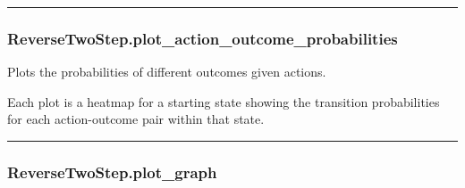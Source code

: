 \begin{Shaded}
\begin{Highlighting}[]
\OperatorTok{=}
\end{Highlighting}
\end{Shaded}

\begin{center}\rule{0.5\linewidth}{\linethickness}\end{center}

\subsubsection{ReverseTwoStep.plot\_action\_outcome\_probabilities}\label{reversetwostep.plot_action_outcome_probabilities}

\begin{Shaded}
\begin{Highlighting}[]
\OperatorTok{=}\OperatorTok{=}\OperatorTok{=}\OperatorTok{=}\NormalTok{)}
\end{Highlighting}
\end{Shaded}

Plots the probabilities of different outcomes given actions.

Each plot is a heatmap for a starting state showing the transition
probabilities for each action-outcome pair within that state.

\begin{center}\rule{0.5\linewidth}{\linethickness}\end{center}

\subsubsection{ReverseTwoStep.plot\_graph}\label{reversetwostep.plot_graph}

\begin{Shaded}
\begin{Highlighting}[]
\OperatorTok{=}\OperatorTok{=}\OperatorTok{=}\OperatorTok{=}\OperatorTok{=}\OperatorTok{=}\OperatorTok{=}\OperatorTok{=}\NormalTok{)}
\end{Highlighting}
\end{Shaded}

